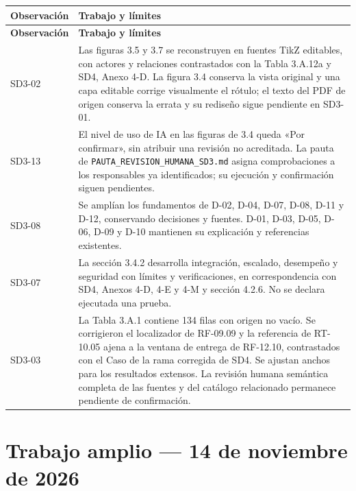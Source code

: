 \documentclass[11pt,letterpaper]{article}
\begin{document}
\begin{longtable}{@{}P{0.17\textwidth}P{\tabcolsep\relax}@{}}
\hline
\textbf{Observación} & \textbf{Trabajo y límites} \\
\hline
\endfirsthead
\hline
\textbf{Observación} & \textbf{Trabajo y límites} \\
\hline
\endhead
\hline
\endfoot
SD3-02 & Las figuras 3.5 y 3.7 se reconstruyen en fuentes TikZ editables, con actores y relaciones contrastados con la Tabla 3.A.12a y SD4, Anexo 4-D. La figura 3.4 conserva la vista original y una capa editable corrige visualmente el rótulo; el texto del PDF de origen conserva la errata y su rediseño sigue pendiente en SD3-01. \\
SD3-13 & El nivel de uso de IA en las figuras de 3.4 queda «Por confirmar», sin atribuir una revisión no acreditada. La pauta de \texttt{PAUTA\_REVISION\_HUMANA\_SD3.md} asigna comprobaciones a los responsables ya identificados; su ejecución y confirmación siguen pendientes. \\
SD3-08 & Se amplían los fundamentos de D-02, D-04, D-07, D-08, D-11 y D-12, conservando decisiones y fuentes. D-01, D-03, D-05, D-06, D-09 y D-10 mantienen su explicación y referencias existentes. \\
SD3-07 & La sección 3.4.2 desarrolla integración, escalado, desempeño y seguridad con límites y verificaciones, en correspondencia con SD4, Anexos 4-D, 4-E y 4-M y sección 4.2.6. No se declara ejecutada una prueba. \\
SD3-03 & La Tabla 3.A.1 contiene 134 filas con origen no vacío. Se corrigieron el localizador de RF-09.09 y la referencia de RT-10.05 ajena a la ventana de entrega de RF-12.10, contrastados con el Caso de la rama corregida de SD4. Se ajustan anchos para los resultados extensos. La revisión humana semántica completa de las fuentes y del catálogo relacionado permanece pendiente de confirmación. \\
\end{longtable}

\section*{Trabajo amplio — 14 de noviembre de 2026}
\end{document}
